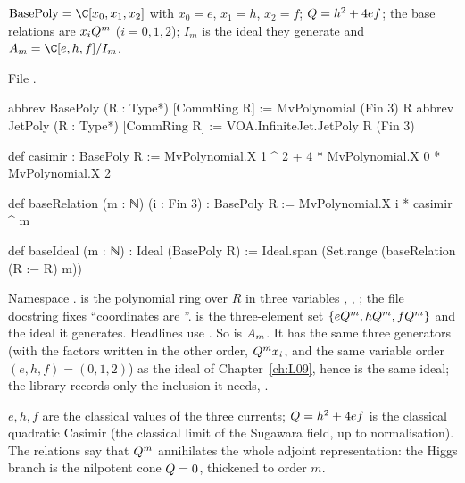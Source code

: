 \begin{definition}\label{l20:def:base}
$\mathrm{BasePoly}=\C[x_0,x_1,x_2]$ with $x_0=e$, $x_1=h$, $x_2=f$; $Q=h^2+4ef$; the base relations
are $x_iQ^m$ ($i=0,1,2$); $I_m$ is the ideal they generate and $\ltwentyA=\C[e,h,f]/I_m$.
\end{definition}
\noindent File .
\begin{leancode}
abbrev BasePoly (R : Type*) [CommRing R] := MvPolynomial (Fin 3) R
abbrev JetPoly (R : Type*) [CommRing R] := VOA.InfiniteJet.JetPoly R (Fin 3)

def casimir : BasePoly R := MvPolynomial.X 1 ^ 2 + 4 * MvPolynomial.X 0 * MvPolynomial.X 2

def baseRelation (m : ℕ) (i : Fin 3) : BasePoly R := MvPolynomial.X i * casimir ^ m

def baseIdeal (m : ℕ) : Ideal (BasePoly R) := Ideal.span (Set.range (baseRelation (R := R) m))
\end{leancode}

\begin{dictionary}
Namespace .  is the polynomial ring over $R$ in
three variables , , ; the file docstring fixes ``coordinates are
''.  is the three-element set
$\{eQ^m,hQ^m,fQ^m\}$ and  the ideal it generates. Headlines use
. So  is $A_m$. It has the same three generators (with the factors
written in the other order, $Q^m x_i$, and the same variable order $(e,h,f)=(0,1,2)$) as the ideal
 of Chapter~\ref{ch:L09}, hence is the same ideal; the library records only the
inclusion it needs, .
\end{dictionary}

\begin{physics}
$e,h,f$ are the classical values of the three currents; $Q=h^2+4ef$ is the classical quadratic
Casimir (the classical limit of the Sugawara field, up to normalisation). The relations say that
$Q^m$ annihilates the whole adjoint representation: the Higgs branch is the nilpotent cone
$Q=0$, thickened to order $m$.
\end{physics}

